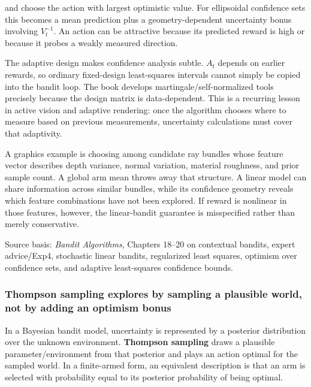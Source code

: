 and choose the action with largest optimistic value. For ellipsoidal confidence sets this becomes a mean prediction plus a geometry-dependent uncertainty bonus involving \(V_t^{-1}\). An action can be attractive because its predicted reward is high or because it probes a weakly measured direction.

The adaptive design makes confidence analysis subtle. \(A_t\) depends on earlier rewards, so ordinary fixed-design least-squares intervals cannot simply be copied into the bandit loop. The book develops martingale/self-normalized tools precisely because the design matrix is data-dependent. This is a recurring lesson in active vision and adaptive rendering: once the algorithm chooses where to measure based on previous measurements, uncertainty calculations must cover that adaptivity.

A graphics example is choosing among candidate ray bundles whose feature vector describes depth variance, normal variation, material roughness, and prior sample count. A global arm mean throws away that structure. A linear model can share information across similar bundles, while its confidence geometry reveals which feature combinations have not been explored. If reward is nonlinear in those features, however, the linear-bandit guarantee is misspecified rather than merely conservative.

Source basis: \emph{Bandit Algorithms}, Chapters 18--20 on contextual bandits, expert advice/Exp4, stochastic linear bandits, regularized least squares, optimism over confidence sets, and adaptive least-squares confidence bounds.

\subsubsection{Thompson sampling explores by sampling a plausible world, not by adding an optimism bonus}\label{02-foundations-ii-ch029-thompson-sampling-explores-by-sampling-a-plausible-world-not-by-adding-an-optimism-bonus}

\hypertarget{02-foundations-ii-ch029-thompson-sampling-explores-by-sampling-a-plausible-world-not-by-adding-an-optimism-bonus}{}

In a Bayesian bandit model, uncertainty is represented by a posterior distribution over the unknown environment. \textbf{Thompson sampling} draws a plausible parameter/environment from that posterior and plays an action optimal for the sampled world. In a finite-armed form, an equivalent description is that an arm is selected with probability equal to its posterior probability of being optimal.

